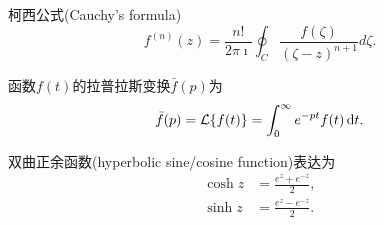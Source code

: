 \documentclass{njustexam}
\begin{document}






\newpage
{} %
柯西公式(Cauchy's formula)
\[
  f^{(n)}(z) = \frac{n!}{2\pi \imath} \oint_C \frac{f(\zeta)}{(\zeta - z)^{n+1}} d \zeta. 
  \label{eq:cauchy_formula_nth_derivative}
\]

\smallskip
函数$f(t)$的拉普拉斯变换$\bar{f}(p)$为
\[
    \bar{f}(p) = \mathcal{L} \{ f(t) \} = \int_0 ^{\infty} e^{-pt} f(t) \mathop{}\!\mathrm{d} t . 
\]

\smallskip

双曲正余函数(hyperbolic sine/cosine function)表达为
\begin{align*}
    \cosh z&= \frac{e^{z} + e^{ - z} }{2} , 
    \\
    \sinh z &= \frac{e^{z} - e^{ - z} }{2} . 
\end{align*}
\end{document}
